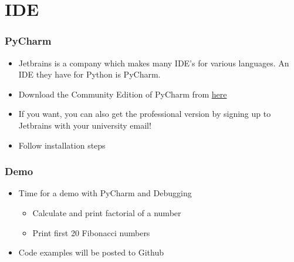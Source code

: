 \documentclass{beamer}
\begin{document}
\section{IDE}
\begin{frame}
  \frametitle{PyCharm}
  \begin{itemize}
  	\item Jetbrains is a company which makes many IDE's for various languages. An IDE they have for Python is PyCharm.
    \item Download the Community Edition of PyCharm from \href{https://www.jetbrains.com/pycharm/}{here}
    \item If you want, you can also get the professional version by signing up to Jetbrains with your university email!
    \item Follow installation steps
   \end{itemize}
\end{frame}
\begin{frame}
  \frametitle{Demo}
  \begin{itemize}
  	\item Time for a demo with PyCharm and Debugging
  		\begin{itemize}
  			\item Calculate and print factorial of a number
  			\item Print first 20 Fibonacci numbers
  		\end{itemize}
  	\item Code examples will be posted to Github
  \end{itemize}
   \end{frame}
\end{document}
